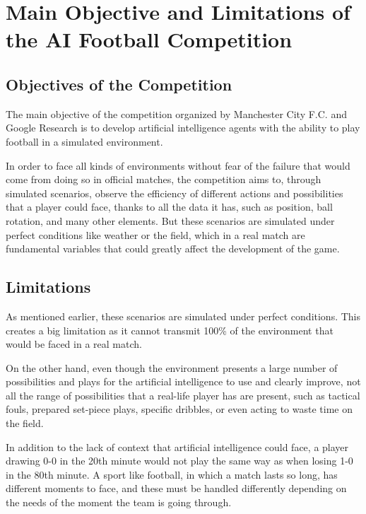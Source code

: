 \section{Main Objective and Limitations of the AI Football Competition}

\subsection*{Objectives of the Competition}

The main objective of the competition organized by Manchester City F.C. and Google Research is to develop artificial intelligence agents with the ability to play football in a simulated environment.

In order to face all kinds of environments without fear of the failure that would come from doing so in official matches, the competition aims to, through simulated scenarios, observe the efficiency of different actions and possibilities that a player could face, thanks to all the data it has, such as position, ball rotation, and many other elements. But these scenarios are simulated under perfect conditions like weather or the field, which in a real match are fundamental variables that could greatly affect the development of the game.

\subsection*{Limitations}

As mentioned earlier, these scenarios are simulated under perfect conditions. This creates a big limitation as it cannot transmit 100\% of the environment that would be faced in a real match.

On the other hand, even though the environment presents a large number of possibilities and plays for the artificial intelligence to use and clearly improve, not all the range of possibilities that a real-life player has are present, such as tactical fouls, prepared set-piece plays, specific dribbles, or even acting to waste time on the field.

In addition to the lack of context that artificial intelligence could face, a player drawing 0-0 in the 20th minute would not play the same way as when losing 1-0 in the 80th minute. A sport like football, in which a match lasts so long, has different moments to face, and these must be handled differently depending on the needs of the moment the team is going through.

